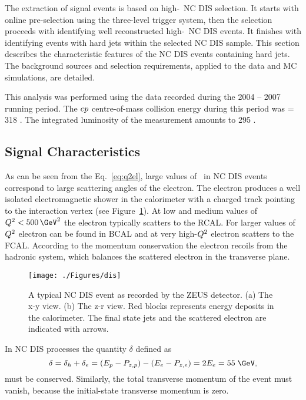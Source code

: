 The extraction of signal events is based on high-\qsq\, NC DIS selection. It starts with online pre-selection using the three-level trigger system, then the selection proceeds with identifying well reconstructed high-\qsq\, NC DIS events. It finishes with identifying events with hard jets within the selected NC DIS sample. This section describes the characteristic features of the NC DIS events containing hard jets. The background sources and selection requirements, applied to the data and MC simulations, are detailed.

This analysis was performed using the data recorded during the 2004 -- 2007 running period. The $\mbox{$e p$}$ centre-of-mass collision energy during this period was \sqs = 318 \GeV. The integrated luminosity of the measurement amounts to 295 \invpb.

\subsection{Signal Characteristics}
\label{subsec:signalchar}
As can be seen from the Eq.~\ref{eq:q2el}, large values of \qsq\, in NC DIS events correspond to large scattering angles of the electron. The electron produces a well isolated electromagnetic shower in the calorimeter with a charged track pointing to the interaction vertex (see Figure~\ref{fig:ncdiseventdisplay}). At low and medium values of $\qsq < 500\, \GeV^2$ the electron typically scatters to the RCAL. For larger values of $\mbox{${Q^2}$}$ electron can be found in BCAL and at very high-$\mbox{${Q^2}$}$ electron scatters to the FCAL. According to the momentum conservation the electron recoils from the hadronic system, which balances the scattered electron in the transverse plane.
\begin{figure}[htbp]
	\centering
	\texttt{[image: ./Figures/dis]} 
	\caption{A typical NC DIS event as recorded by the ZEUS detector. (a) The x-y view. (b) The z-r view. Red blocks represents energy deposits in the calorimeter. The final state jets and the scattered electron are indicated with arrows.}
	\label{fig:ncdiseventdisplay}
\end{figure}
In NC DIS processes the quantity $\delta$ defined as
\begin{equation}
\delta = \delta_h + \delta_e = \left( E_p - P_{z,p} \right) - \left( E_e - P_{z,e}\right) = 2E_e = 55\;\GeV,
\label{eq:deltadis}
\end{equation}
must be conserved. Similarly, the total transverse momentum of the event must vanish, because the initial-state transverse momentum is zero.

